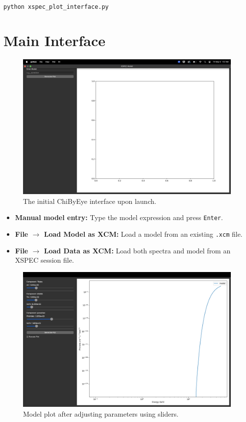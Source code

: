 \documentclass[11pt]{article}
\begin{document}
\begin{lstlisting}[language=bash]
python xspec_plot_interface.py
\end{lstlisting}

\section*{Main Interface}

\begin{figure}[H]
    \centering
    \includegraphics[width=0.7\linewidth]{documentation_images/initial_screen.png}
    \caption{The initial ChiByEye interface upon launch.}
\end{figure}

\begin{itemize}
    \item \textbf{Manual model entry:} Type the model expression and press \texttt{Enter}.
    \item \textbf{File $\rightarrow$ Load Model as XCM:} Load a model from an existing \texttt{.xcm} file.
    \item \textbf{File $\rightarrow$ Load Data as XCM:} Load both spectra and model from an XSPEC session file.
\end{itemize}


\begin{figure}[H]
    \centering
    \includegraphics[width=0.7\linewidth]{documentation_images/plot_after_changing_sliders.png}
    \caption{Model plot after adjusting parameters using sliders.}
\end{figure}
\end{document}
